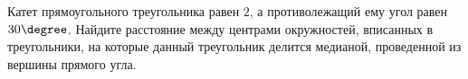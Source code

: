 \begin{ex}
	\begin{condition}
		Катет прямоугольного треугольника равен \( 2 \), а противолежащий ему угол равен \( 30\degree \). Найдите расстояние между центрами окружностей, вписанных в треугольники, на которые данный треугольник делится медианой, проведенной из вершины прямого угла.
	\end{condition}
\end{ex}